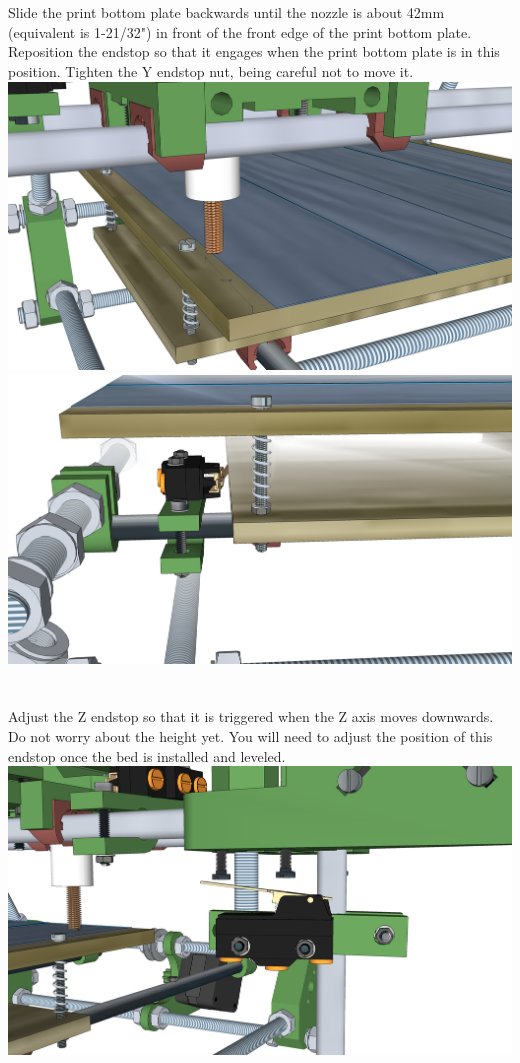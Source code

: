 \documentclass[twoside,a4paper,titlepage]{memoir}
\begin{document}
	\section{}
	Slide the print bottom plate backwards until the nozzle is about 42mm (equivalent is 1-21/32") in front of
	the front edge of the print bottom plate. Reposition the endstop so that it engages when the print bottom
	plate is in this position. Tighten the Y endstop nut, being careful not to move it.\\
	\includegraphics[width=1\linewidth]{graphics/ch10_8_1.png}
	\includegraphics[width=1\linewidth]{graphics/ch10_8_2.png}
	
	\section{}
	Adjust the Z endstop so that it is triggered when the Z axis moves downwards. Do not worry about the
	height yet. You will need to adjust the position of this endstop once the bed is installed and leveled.\\
	\includegraphics[width=1\linewidth]{graphics/ch10_9.png}
	
\end{document}
